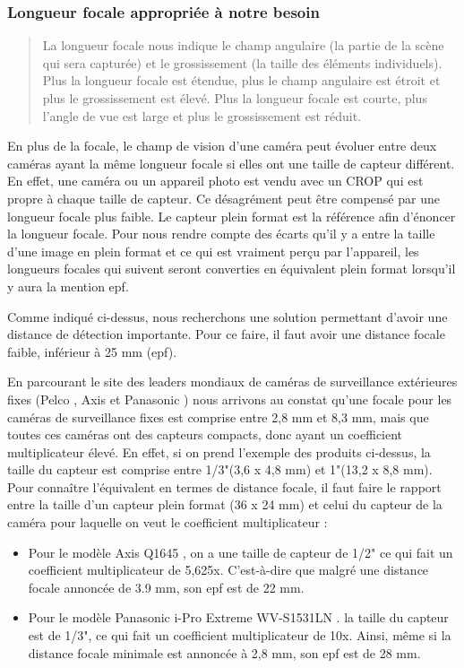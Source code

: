 \subsubsection{Longueur focale appropriée à notre besoin}
\label{sec:camera_focale}

\blockquote{La longueur focale nous indique le champ angulaire (la partie de la scène qui sera capturée)
    et le grossissement (la taille des éléments individuels).
    Plus la longueur focale est étendue, plus le champ angulaire est étroit et plus le grossissement est élevé.
    Plus la longueur focale est courte, plus l’angle de vue est large et plus le grossissement est réduit.}{\cite{focale}}

En plus de la focale, le champ de vision d'une caméra peut évoluer entre deux caméras ayant la même longueur focale
si elles ont une taille de capteur différent.
En effet, une caméra ou un appareil photo est vendu avec un \gls{CROP} qui est propre à chaque taille de capteur.
Ce désagrément peut être compensé par une longueur focale plus faible.
Le capteur plein format est la référence afin d'énoncer la longueur focale.
Pour nous rendre compte des écarts qu'il y a entre la taille d'une image en plein format et ce qui est vraiment perçu par l'appareil,
les longueurs focales qui suivent seront converties en équivalent plein format lorsqu'il y aura la mention \gls{epf}.

Comme indiqué ci-dessus, nous recherchons une solution permettant d'avoir une distance de détection importante.
Pour ce faire, il faut avoir une distance focale faible, inférieur à 25 mm (\gls{epf}).

En parcourant le site des leaders mondiaux de caméras de surveillance extérieures fixes
(Pelco \cite{pelco}, Axis \cite{axis} et Panasonic \cite{panasonic})
nous arrivons au constat qu'une focale pour les caméras de surveillance fixes est comprise entre 2,8 mm et 8,3 mm, mais que toutes ces caméras ont des capteurs compacts, donc ayant un coefficient multiplicateur élevé.
En effet, si on prend l'exemple des produits ci-dessus, la taille du capteur est comprise entre 1/3"(3,6 x 4,8 mm) et 1"(13,2 x 8,8 mm).
Pour connaître l'équivalent en termes de distance focale, il faut faire le rapport entre la taille d'un capteur plein format (36 x 24 mm)
et celui du capteur de la caméra pour laquelle on veut le coefficient multiplicateur :
\begin{itemize}
    \item Pour le modèle Axis Q1645 \cite{axisQ1645}, on a une taille de capteur de 1/2"
          ce qui fait un coefficient multiplicateur de 5,625x. C'est-à-dire que malgré une distance focale annoncée de 3.9 mm, son \gls{epf} est de 22 mm.
    \item Pour le modèle Panasonic i-Pro Extreme WV-S1531LN \cite{panaIPro}.
          la taille du capteur est de 1/3", ce qui fait un coefficient multiplicateur de 10x. Ainsi, même si la distance focale minimale est annoncée à 2,8 mm, son \gls{epf} est de 28 mm.
\end{itemize}

